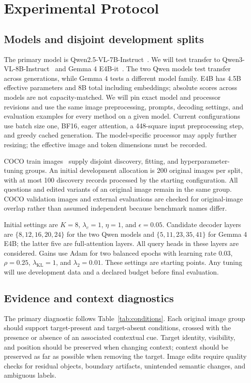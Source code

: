 \section{Experimental Protocol}
\label{sec:experiments}

\subsection{Models and disjoint development splits}
The primary model is Qwen2.5-VL-7B-Instruct~\cite{qwen25vl}. We will test
transfer to Qwen3-VL-8B-Instruct~\cite{qwen3vl} and Gemma 4 E4B-it~\cite{gemma4}.
The two Qwen models test transfer across generations, while Gemma 4 tests
a different model family. E4B has 4.5B effective parameters and 8B total
including embeddings; absolute scores across models are not capacity-matched.
We will pin exact model and
processor revisions and use the same image preprocessing, prompts, decoding
settings, and evaluation examples for every method on a given model.
Current configurations use batch size one, BF16, eager attention, a
448-square input preprocessing step, and greedy cached generation.
The model-specific processor may apply further resizing; the effective
image and token dimensions must be recorded.

COCO train images~\cite{coco} supply disjoint discovery, fitting, and
hyperparameter-tuning groups. An initial development allocation is 200
original images per split, with at most 100 discovery records processed
by the starting configuration. All questions and edited variants of an
original image remain in the same group. COCO validation images and
external evaluations are checked for original-image overlap rather than
assumed independent because benchmark names differ.

Initial \method settings are $K=8$, $\lambda_c=1$, $\eta=1$, and
$\epsilon=0.05$. Candidate decoder layers are $\{8,12,16,20,24\}$ for the
two Qwen models and $\{5,11,23,35,41\}$ for Gemma 4 E4B; the latter five
are full-attention layers. All query heads in these layers are considered.
Gains use Adam for two balanced epochs
with learning rate $0.03$, $\rho=0.25$, $\lambda_{\mathrm{KL}}=1$, and
$\lambda_2=0.01$. These settings are starting points. Any tuning will use
development data and a declared budget before final evaluation.

\subsection{Evidence and context diagnostics}
The primary diagnostic follows Table~\ref{tab:conditions}. Each original
image group should support target-present and target-absent conditions,
crossed with the presence or absence of an associated contextual cue.
Target identity, visibility, and position should be preserved when changing
context; context should be preserved as far as possible when removing the
target. Image edits require quality checks for residual objects, boundary
artifacts, unintended semantic changes, and ambiguous labels.

